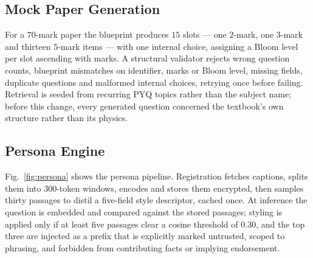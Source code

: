 \documentclass[conference]{IEEEtran}
\begin{document}
\subsection{Mock Paper Generation}
For a $70$-mark paper the blueprint produces $15$ slots --- one $2$-mark, one
$3$-mark and thirteen $5$-mark items --- with one internal choice, assigning a
Bloom level per slot ascending with marks. A structural validator rejects wrong
question counts, blueprint mismatches on identifier, marks or Bloom level,
missing fields, duplicate questions and malformed internal choices, retrying
once before failing. Retrieval is seeded from recurring PYQ topics rather than
the subject name; before this change, every generated question concerned the
textbook's own structure rather than its physics.

\subsection{Persona Engine}
\label{sec:persona}
Fig.~\ref{fig:persona} shows the persona pipeline. Registration fetches
captions, splits them into $300$-token windows, encodes and stores them
encrypted, then samples thirty passages to distil a five-field style descriptor,
cached once. At inference the question is embedded and compared against the
stored passages; styling is applied only if at least five passages clear a
cosine threshold of $0.30$, and the top three are injected as a prefix that is
explicitly marked untrusted, scoped to phrasing, and forbidden from contributing
facts or implying endorsement.
\end{document}
